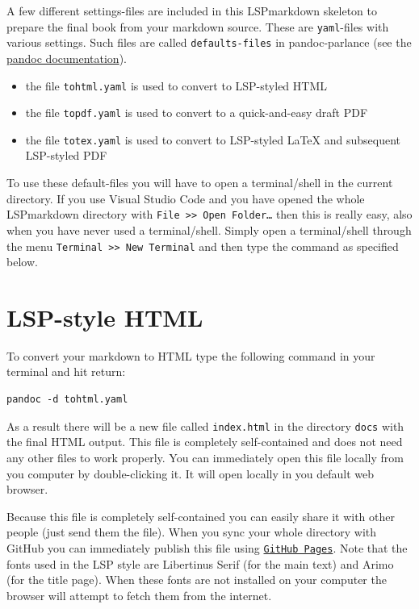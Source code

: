 A\paragraphnumber{[3.1]} few different settings-files are included in
this LSPmarkdown skeleton to prepare the final book from your markdown
source. These are \texttt{yaml}-files with various settings. Such files
are called \texttt{defaults-files} in pandoc-parlance (see the
\href{https://pandoc.org/MANUAL.html\#defaults-files}{pandoc
documentation}).

\begin{itemize}
\tightlist
\item
  the file \texttt{tohtml.yaml} is used to convert to LSP-styled HTML
\item
  the file \texttt{topdf.yaml} is used to convert to a quick-and-easy
  draft PDF
\item
  the file \texttt{totex.yaml} is used to convert to LSP-styled LaTeX
  and subsequent LSP-styled PDF
\end{itemize}

To\paragraphnumber{[3.2]} use these default-files you will have to open
a terminal/shell in the current directory. If you use Visual Studio Code
and you have opened the whole LSPmarkdown directory with
\texttt{File\ \textgreater{}\textgreater{}\ Open\ Folder…} then this is
really easy, also when you have never used a terminal/shell. Simply open
a terminal/shell through the menu
\texttt{Terminal\ \textgreater{}\textgreater{}\ New\ Terminal} and then
type the command as specified below.

\hypertarget{lsp-style-html}{%
\section{LSP-style HTML}\label{lsp-style-html}}

To\paragraphnumber{[3.3]} convert your markdown to HTML type the
following command in your terminal and hit return:

\begin{verbatim}
pandoc -d tohtml.yaml
\end{verbatim}

As\paragraphnumber{[3.4]} a result there will be a new file called
\texttt{index.html} in the directory \texttt{docs} with the final HTML
output. This file is completely self-contained and does not need any
other files to work properly. You can immediately open this file locally
from you computer by double-clicking it. It will open locally in you
default web browser.

Because\paragraphnumber{[3.5]} this file is completely self-contained
you can easily share it with other people (just send them the file).
When you sync your whole directory with GitHub you can immediately
publish this file using
\href{https://docs.github.com/en/pages/getting-started-with-github-pages/configuring-a-publishing-source-for-your-github-pages-site}{\texttt{GitHub\ Pages}}.
Note that the fonts used in the LSP style are Libertinus Serif (for the
main text) and Arimo (for the title page). When these fonts are not
installed on your computer the browser will attempt to fetch them from
the internet.


